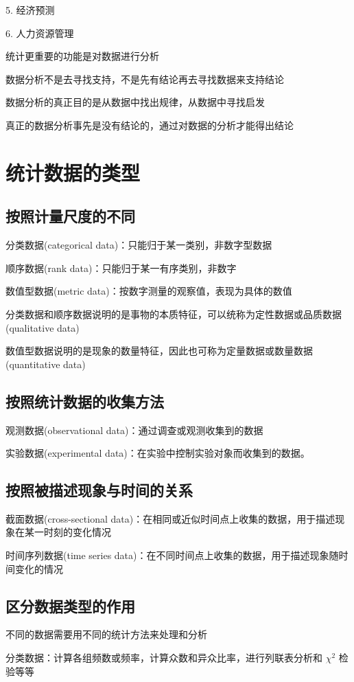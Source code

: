 \documentclass[UTF8,10pt]{book}
\begin{document}
    5. 经济预测

    6. 人力资源管理

    统计更重要的功能是对数据进行分析

    数据分析不是去寻找支持，不是先有结论再去寻找数据来支持结论

    数据分析的真正目的是从数据中找出规律，从数据中寻找启发

    真正的数据分析事先是没有结论的，通过对数据的分析才能得出结论
    \section{统计数据的类型}
    \subsection{按照计量尺度的不同}
    分类数据(categorical data)：只能归于某一类别，非数字型数据

    顺序数据(rank data)：只能归于某一有序类别，非数字

    数值型数据(metric data)：按数字测量的观察值，表现为具体的数值

    分类数据和顺序数据说明的是事物的本质特征，可以统称为定性数据或品质数据(qualitative data)

    数值型数据说明的是现象的数量特征，因此也可称为定量数据或数量数据(quantitative data)

    \subsection{按照统计数据的收集方法}
    观测数据(observational data)：通过调查或观测收集到的数据

    实验数据(experimental data)：在实验中控制实验对象而收集到的数据。

    \subsection{按照被描述现象与时间的关系}
    截面数据(cross-sectional data)：在相同或近似时间点上收集的数据，用于描述现象在某一时刻的变化情况

    时间序列数据(time series data)：在不同时间点上收集的数据，用于描述现象随时间变化的情况

    \subsection{区分数据类型的作用}
    不同的数据需要用不同的统计方法来处理和分析

    分类数据：计算各组频数或频率，计算众数和异众比率，进行列联表分析和 $\chi^2$ 检验等等
\end{document}
